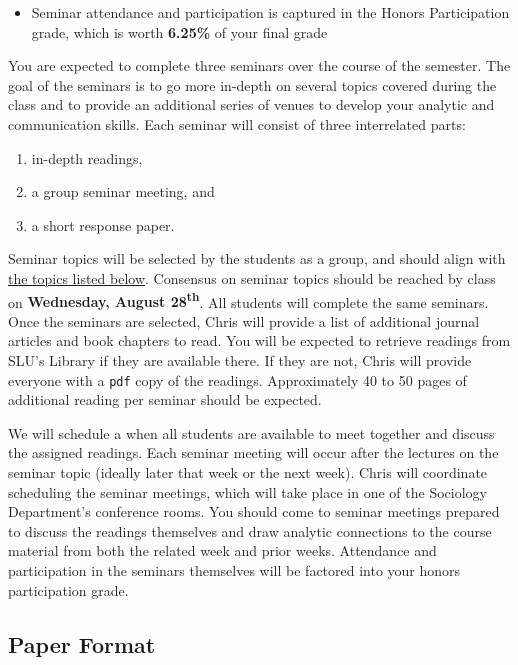 \documentclass[]{book}
\providecommand{\tightlist}{%
  \setlength{\itemsep}{0pt}\setlength{\parskip}{0pt}}
\newenvironment{rmdblock}[1]
  {\begin{shaded*}
  \begin{itemize}
  \renewcommand{\labelitemi}{
    \raisebox{-.7\height}[0pt][0pt]{
      {\setkeys{Gin}{width=3em,keepaspectratio}\texttt{[image: images/\#1]}}
    }
  }
  \item
  }
  {
  \end{itemize}
  \end{shaded*}
  }
\newenvironment{rmdtip}
  {\begin{rmdblock}{tip}}
  {\end{rmdblock}}
\begin{document}
\begin{rmdtip}
Seminar attendance and participation is captured in the Honors
Participation grade, which is worth \textbf{6.25\%} of your final grade
\end{rmdtip}

You are expected to complete three seminars over the course of the semester. The goal of the seminars is to go more in-depth on several topics covered during the class and to provide an additional series of venues to develop your analytic and communication skills. Each seminar will consist of three interrelated parts:

\begin{enumerate}
\def\labelenumi{\arabic{enumi}.}
\tightlist
\item
  in-depth readings,
\item
  a group seminar meeting, and
\item
  a short response paper.
\end{enumerate}

Seminar topics will be selected by the students as a group, and should align with \href{/honors-seminar-topics.html}{the topics listed below}. Consensus on seminar topics should be reached by class on \textbf{Wednesday, August 28\textsuperscript{th}}. All students will complete the same seminars. Once the seminars are selected, Chris will provide a list of additional journal articles and book chapters to read. You will be expected to retrieve readings from SLU's Library if they are available there. If they are not, Chris will provide everyone with a \texttt{pdf} copy of the readings. Approximately 40 to 50 pages of additional reading per seminar should be expected.

We will schedule a when all students are available to meet together and discuss the assigned readings. Each seminar meeting will occur after the lectures on the seminar topic (ideally later that week or the next week). Chris will coordinate scheduling the seminar meetings, which will take place in one of the Sociology Department's conference rooms. You should come to seminar meetings prepared to discuss the readings themselves and draw analytic connections to the course material from both the related week and prior weeks. Attendance and participation in the seminars themselves will be factored into your honors participation grade.

\hypertarget{paper-format}{%
\subsection{Paper Format}\label{paper-format}}
\end{document}
